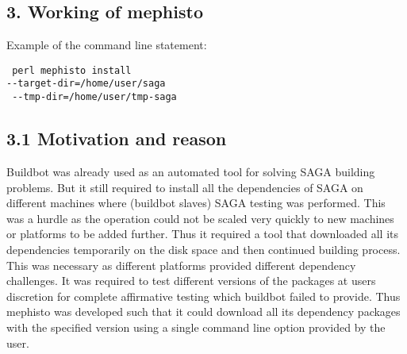 \documentclass[a4paper,10pt]{article}
\begin{document}
\begin{multicols}{2}
\section*{\normalsize 3. Working of mephisto}
Example of the command line statement: 
\begin{verbatim} perl mephisto install 
--target-dir=/home/user/saga
 --tmp-dir=/home/user/tmp-saga \end{verbatim} 
\subsection*{\normalsize 3.1 Motivation and reason}
Buildbot was already used as an automated tool for solving SAGA building problems. But it still required to install all the dependencies of SAGA 
on different machines where (buildbot slaves) SAGA testing was performed. This was a hurdle as the operation could not be scaled very quickly to 
new machines or platforms to be added further. Thus it required a tool that downloaded all its dependencies temporarily on the disk space and then
continued building process. This was necessary as different platforms provided different dependency challenges. It was required to test 
different versions of the packages at users discretion for complete affirmative testing which buildbot failed to provide. Thus mephisto
was developed such that it could download all its dependency packages with the specified version using a single command line option
provided by the user. 

\end{multicols}
\end{document}
